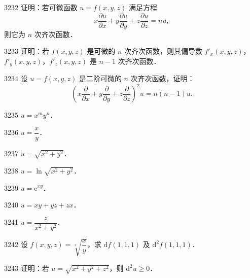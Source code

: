 \begin{prob}[M]{3232}
证明：若可微函数 $u = f(x,y,z)$ 满足方程
\[
x\frac{\partial u}{\partial x} + y\frac{\partial u}{\partial y} + z\frac{\partial u}{\partial z} = nu,
\]
则它为 $n$ 次齐次函数．
\end{prob}

\begin{prob}[M]{3233}
证明：若 $f(x,y,z)$ 是可微的 $n$ 次齐次函数，则其偏导数 $f'_x(x,y,z)$，$f'_y(x,y,z)$，$f'_z(x,y,z)$ 是 $n-1$ 次齐次函数．
\end{prob}

\begin{prob}[M]{3234}
设 $u = f(x,y,z)$ 是二阶可微的 $n$ 次齐次函数，证明：
\[
\left(x\frac{\partial}{\partial x} + y\frac{\partial}{\partial y} + z\frac{\partial}{\partial z}\right)^2 u = n(n-1)u.
\]
\end{prob}


\begin{prob}[S]{3235}
$u = x^m y^n$．
\end{prob}

\begin{prob}[S]{3236}
$u = \dfrac{x}{y}$．
\end{prob}

\begin{prob}[S]{3237}
$u = \sqrt{x^2+y^2}$．
\end{prob}

\begin{prob}[S]{3238}
$u = \ln\sqrt{x^2+y^2}$．
\end{prob}

\begin{prob}[S]{3239}
$u = \mathrm{e}^{xy}$．
\end{prob}

\begin{prob}[S]{3240}
$u = xy + yz + zx$．
\end{prob}

\begin{prob}[S]{3241}
$u = \dfrac{z}{x^2+y^2}$．
\end{prob}

\begin{prob}[M]{3242}
设 $f(x,y,z) = \sqrt[z]{\dfrac{x}{y}}$，求 $\mathrm{d}f(1,1,1)$ 及 $\mathrm{d}^2 f(1,1,1)$．
\end{prob}

\begin{prob}[M]{3243}
证明：若 $u = \sqrt{x^2+y^2+z^2}$，则 $\mathrm{d}^2 u \geqslant 0$．
\end{prob}

